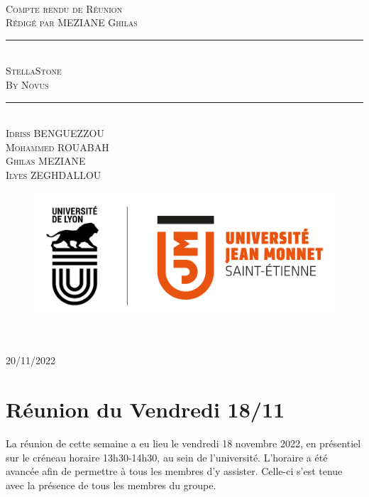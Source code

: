 \documentclass[a4paper, 12pt]{article}
\newcommand{\HRule}{\rule{\linewidth}{0.5mm}}
\begin{document}
\begin{titlepage}
  \begin{sffamily}
  \begin{center}

   
    \textsc{\LARGE }\\[2cm]

    \textsc{\Large Compte rendu de Réunion}\\[1.5cm]
    \textsc{\Medium Rédigé par MEZIANE Ghilas}

    \HRule \\[0.4cm]
    { \huge  \textsc{StellaStone} \\
    \textsc{\Large By Novus}\\ [0.4cm] }
	

    \HRule \\[2cm]
    \textsc {Idriss BENGUEZZOU\\Mohammed ROUABAH\\Ghilas MEZIANE \\ Ilyes ZEGHDALLOU}
 \begin{figure}
     \centering
    \includegraphics[scale=0.2]{logoUJM.png}
     \label{fig:ujm_logo}
 \end{figure}
   
    \

    \vfill

    {\large {} 20/11/2022}

  \end{center}
  \end{sffamily}
\end{titlepage}

\newpage

\section{Réunion du Vendredi 18/11}
La réunion de cette semaine a eu lieu le vendredi 18 novembre 2022, en présentiel sur le créneau horaire 13h30-14h30, au sein de l'université. L'horaire a été avancée afin de permettre à tous les membres d'y assister.  Celle-ci s'est tenue avec la présence de tous les membres du groupe. \\
\end{document}
